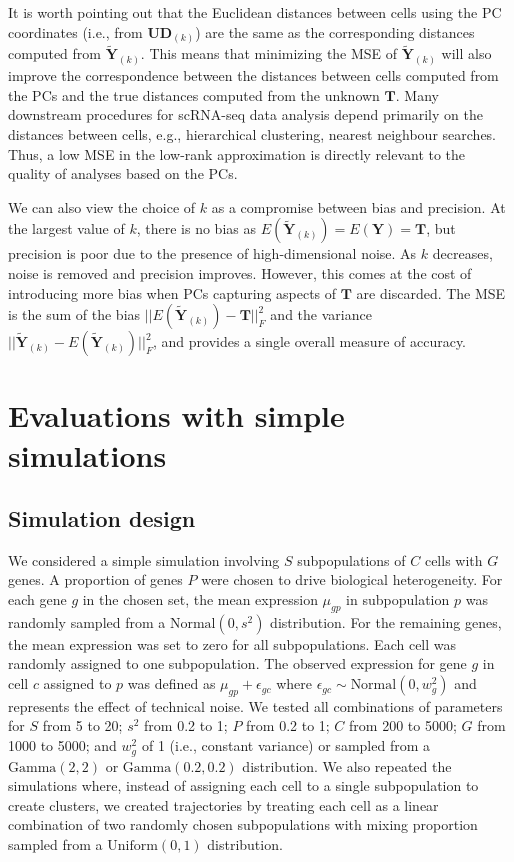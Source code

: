\documentclass[10pt,letterpaper]{article}
\begin{document}
It is worth pointing out that the Euclidean distances between cells using the PC coordinates (i.e., from $\mathbf{U}\mathbf{D}_{(k)}$) are the same as the corresponding distances computed from $\mathbf{\tilde Y}_{(k)}$.
This means that minimizing the MSE of $\mathbf{\tilde Y}_{(k)}$ will also improve the correspondence between the distances between cells computed from the PCs and the true distances computed from the unknown $\mathbf{T}$.
Many downstream procedures for scRNA-seq data analysis depend primarily on the distances between cells, e.g., hierarchical clustering, nearest neighbour searches.
Thus, a low MSE in the low-rank approximation is directly relevant to the quality of analyses based on the PCs.

We can also view the choice of $k$ as a compromise between bias and precision.
At the largest value of $k$, there is no bias as $E(\mathbf{\tilde Y}_{(k)}) = E(\mathbf{Y}) = \mathbf{T}$, but precision is poor due to the presence of high-dimensional noise.
As $k$ decreases, noise is removed and precision improves.
However, this comes at the cost of introducing more bias when PCs capturing aspects of $\mathbf{T}$ are discarded.
The MSE is the sum of the bias $||E(\mathbf{\tilde Y}_{(k)}) - \mathbf{T}||^2_F$ and the variance $||\mathbf{\tilde Y}_{(k)} - E(\mathbf{\tilde Y}_{(k)})||^2_F$, and provides a single overall measure of accuracy.

\section{Evaluations with simple simulations}

\subsection{Simulation design}
We considered a simple simulation involving $S$ subpopulations of $C$ cells with $G$ genes.
A proportion of genes $P$ were chosen to drive biological heterogeneity.
For each gene $g$ in the chosen set, the mean expression $\mu_{gp}$ in subpopulation $p$ was randomly sampled from a $\mbox{Normal}(0, s^2)$ distribution.
For the remaining genes, the mean expression was set to zero for all subpopulations.
Each cell was randomly assigned to one subpopulation.
The observed expression for gene $g$ in cell $c$ assigned to $p$ was defined as $\mu_{gp} + \epsilon_{gc}$ where $\epsilon_{gc} \sim \mbox{Normal}(0, w^2_g)$ and represents the effect of technical noise.
We tested all combinations of parameters for $S$ from 5 to 20; $s^2$ from 0.2 to 1; $P$ from 0.2 to 1; $C$ from 200 to 5000; $G$ from 1000 to 5000;
and $w^2_g$ of 1 (i.e., constant variance) or sampled from a $\mbox{Gamma}(2,2)$ or $\mbox{Gamma}(0.2,0.2)$ distribution.
We also repeated the simulations where, instead of assigning each cell to a single subpopulation to create clusters,
we created trajectories by treating each cell as a linear combination of two randomly chosen subpopulations with mixing proportion sampled from a $\mbox{Uniform}(0, 1)$ distribution.
\end{document}
